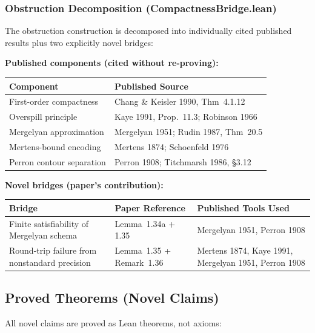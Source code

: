 \subsubsection*{Obstruction Decomposition (CompactnessBridge.lean)}

The obstruction construction is decomposed into individually cited
published results plus two explicitly novel bridges:

\textbf{Published components (cited without re-proving):}

\begin{center}
\begin{tabular}{lp{8cm}}
\toprule
\textbf{Component} & \textbf{Published Source} \\
\midrule
First-order compactness & Chang \& Keisler 1990, Thm~4.1.12 \\
Overspill principle & Kaye 1991, Prop.~11.3; Robinson 1966 \\
Mergelyan approximation & Mergelyan 1951; Rudin 1987, Thm~20.5 \\
Mertens-bound encoding & Mertens 1874; Schoenfeld 1976 \\
Perron contour separation & Perron 1908; Titchmarsh 1986, \S3.12 \\
\bottomrule
\end{tabular}
\end{center}

\textbf{Novel bridges (paper's contribution):}

\begin{center}
\begin{tabular}{lp{5cm}p{4cm}}
\toprule
\textbf{Bridge} & \textbf{Paper Reference} & \textbf{Published Tools Used} \\
\midrule
Finite satisfiability of Mergelyan schema & Lemma~1.34a + 1.35 & Mergelyan 1951, Perron 1908 \\
Round-trip failure from nonstandard precision & Lemma~1.35 + Remark~1.36 & Mertens 1874, Kaye 1991, Mergelyan 1951, Perron 1908 \\
\bottomrule
\end{tabular}
\end{center}

\subsection*{Proved Theorems (Novel Claims)}

All novel claims are proved as Lean theorems, not axioms:

